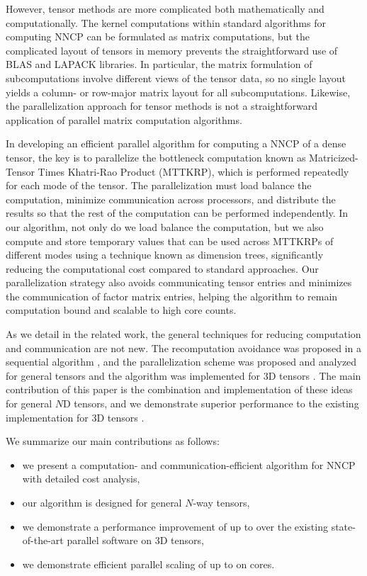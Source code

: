 However, tensor methods are more complicated both mathematically and computationally.
The kernel computations within standard algorithms for computing NNCP can be formulated as matrix computations, but the complicated layout of tensors in memory prevents the straightforward use of BLAS and LAPACK libraries.
In particular, the matrix formulation of subcomputations involve different views of the tensor data, so no single layout yields a column- or row-major matrix layout for all subcomputations.
Likewise, the parallelization approach for tensor methods is not a straightforward application of parallel matrix computation algorithms.

In developing an efficient parallel algorithm for computing a NNCP of a dense tensor, the key is to parallelize the bottleneck computation known as Matricized-Tensor Times Khatri-Rao Product (MTTKRP), which is performed repeatedly for each mode of the tensor.
The parallelization must load balance the computation, minimize communication across processors, and distribute the results so that the rest of the computation can be performed independently.
In our algorithm, not only do we load balance the computation, but we also compute and store temporary values that can be used across MTTKRPs of different modes using a technique known as dimension trees, significantly reducing the computational cost compared to standard approaches.
Our parallelization strategy also avoids communicating tensor entries and minimizes the communication of factor matrix entries, helping the algorithm to remain computation bound and scalable to high core counts.

As we detail in the related work, the general techniques for reducing computation and communication are not new.
The recomputation avoidance was proposed in a sequential algorithm \cite{PTC13a}, and the parallelization scheme was proposed and analyzed for general tensors \cite{BKR17-TR} and the algorithm was implemented for 3D tensors \cite{LK+17b}.
The main contribution of this paper is the combination and implementation of these ideas for general $N$D tensors, and we demonstrate superior performance to the existing implementation for 3D tensors \cite{LK+17b}.

We summarize our main contributions as follows:
\begin{itemize}
		\item we present a computation- and communication-efficient algorithm for NNCP with detailed cost analysis,
		\item our algorithm is designed for general $N$-way tensors,
		\item we demonstrate a performance improvement of up to \grey{$2.2\times$} over the existing state-of-the-art parallel software on 3D tensors,
		\item we demonstrate efficient parallel scaling of up to \grey{$253\times$} on  cores.
\end{itemize}